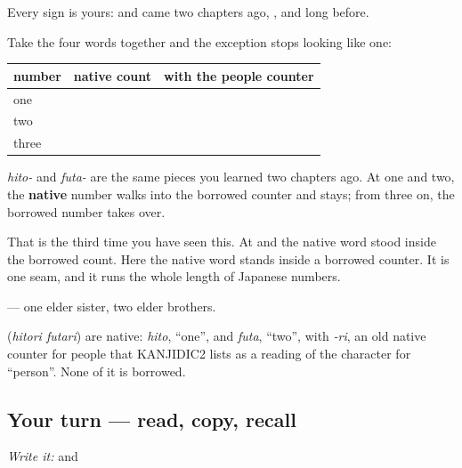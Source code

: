 Every sign is yours: \textbf{} and \textbf{} came two chapters ago, \textbf{}, \textbf{} and \textbf{} long before.

\begin{grammarlens}[title={Grammar Lens — the seam, one more time}]
Take the four words together and the exception stops looking like one:

\noindent
\begin{tabularx}{\linewidth}{@{}>{\raggedright\arraybackslash}X>{\raggedright\arraybackslash}X>{\raggedright\arraybackslash}X@{}}
\toprule
\textbf{number} & \textbf{native count} & \textbf{with the people counter} \\
\midrule
one & \textbf{\ja{ひとつ}} & \textbf{\ja{ひとり}} \\
two & \textbf{\ja{ふたつ}} & \textbf{\ja{ふたり}} \\
three & \textbf{\ja{みっつ}} & \textbf{\ja{さんにん}} \\
\bottomrule
\end{tabularx}

\emph{hito-} and \emph{futa-} are the same pieces you learned two chapters ago. At one and two, the \textbf{native} number walks into the borrowed counter and stays; from three on, the borrowed number takes over.

That is the third time you have seen this. At \textbf{} and \textbf{} the native word stood inside the borrowed count. Here the native word stands inside a borrowed counter. It is one seam, and it runs the whole length of Japanese numbers.

\textbf{  } — one elder sister, two elder brothers.
\end{grammarlens}

\begin{cousinweb}
\textbf{ } (\emph{hitori futari}) are native: \emph{hito}, \textquotedblleft{}one\textquotedblright{}, and \emph{futa}, \textquotedblleft{}two\textquotedblright{}, with \emph{-ri}, an old native counter for people that KANJIDIC2 lists as a reading of the character for \textquotedblleft{}person\textquotedblright{}. None of it is borrowed.
\end{cousinweb}

\subsection*{Your turn — read, copy, recall}
\emph{Write it:} \textbf{} and \textbf{}

